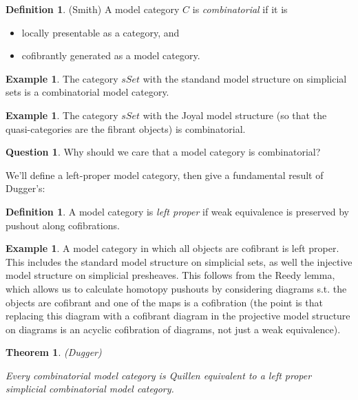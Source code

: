 \documentclass[letterpaper]{article}
\newtheorem{theorem}{Theorem}
\theoremstyle{definition}
\newtheorem{example}[lemma]{Example}
\newtheorem{definition}[lemma]{Definition}
\newtheorem{question}{Question}
\begin{document}
\begin{definition}(Smith)
A model category $C$ is \emph{combinatorial} if it is

\begin{itemize}
\item locally presentable as a category, and
\item cofibrantly generated as a model category.
\end{itemize}


\end{definition}

\begin{example}
The category $sSet$ with the standand model structure on simplicial
sets is a combinatorial model category.
\end{example}

\begin{example}
The category $sSet$ with the Joyal model structure (so that the
quasi-categories are the fibrant objects) is combinatorial.
\end{example}

\begin{question}
Why should we care that a model category is combinatorial?
\end{question}




We'll define a left-proper model category, then give a fundamental
result of Dugger's:

\begin{definition}
A model category is \emph{left proper} if weak equivalence is
preserved by pushout along cofibrations.
\end{definition}

\begin{example}
A model category in which all objects are cofibrant is left
proper. This includes the standard model structure on simplicial sets,
as well the injective model structure on simplicial presheaves. This
follows from the Reedy lemma, which allows us to calculate homotopy
pushouts by considering diagrams s.t. the objects are cofibrant and
one of the maps is a cofibration (the point is that replacing this
diagram with a cofibrant diagram in the projective model structure on
diagrams is an acyclic cofibration of diagrams, not just a weak equivalence).
\end{example}

\begin{theorem}(Dugger)

Every combinatorial model category is Quillen equivalent to a left
proper simplicial combinatorial model category.
\end{theorem}
\end{document}

